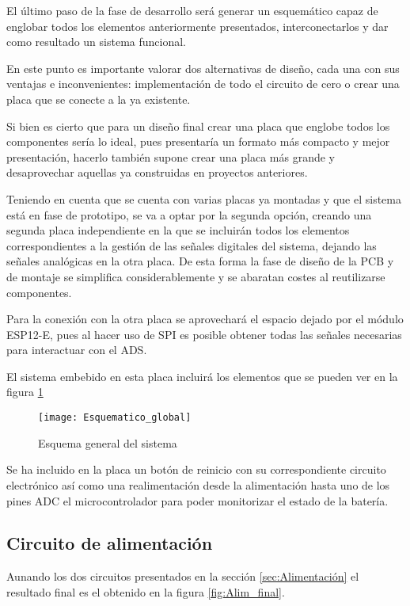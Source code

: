 El último paso de la fase de desarrollo será generar un esquemático capaz de englobar todos los elementos anteriormente presentados, interconectarlos y dar como resultado un sistema funcional.

En este punto es importante valorar dos alternativas de diseño, cada una con sus ventajas e inconvenientes: implementación de todo el circuito de cero o crear una placa que se conecte a la ya existente.

Si bien es cierto que para un diseño final crear una placa que englobe todos los componentes sería lo ideal, pues presentaría un formato más compacto y mejor presentación, hacerlo también supone crear una placa más grande y desaprovechar aquellas ya construidas en proyectos anteriores.

Teniendo en cuenta que se cuenta con varias placas ya montadas y que el sistema está en fase de prototipo, se va a optar por la segunda opción, creando una segunda placa independiente en la que se incluirán todos los elementos correspondientes a la gestión de las señales digitales del sistema, dejando las señales analógicas en la otra placa. De esta forma la fase de diseño de la \acrshort{PCB} y de montaje se simplifica considerablemente y se abaratan costes al reutilizarse componentes.

Para la conexión con la otra placa se aprovechará el espacio dejado por el módulo ESP12-E, pues al hacer uso de \acrshort{SPI} es posible obtener todas las señales necesarias para interactuar con el ADS.

El sistema embebido en esta placa incluirá los elementos que se pueden ver en la figura \ref{fig:Esquematico_global}

\begin{figure} [h]
    \centering
    \texttt{[image: Esquematico\_global]}
    \caption{Esquema general del sistema}
    \label{fig:Esquematico_global}
\end{figure}

Se ha incluido en la placa un botón de reinicio con su correspondiente circuito electrónico así como una realimentación desde la alimentación hasta uno de los pines \acrshort{ADC} el microcontrolador para poder monitorizar el estado de la batería.

\subsection{Circuito de alimentación\label{sec:Esquemáticos_alim}}

Aunando los dos circuitos presentados en la sección \ref{sec:Alimentación} el resultado final es el obtenido en la figura \ref{fig:Alim_final}.

